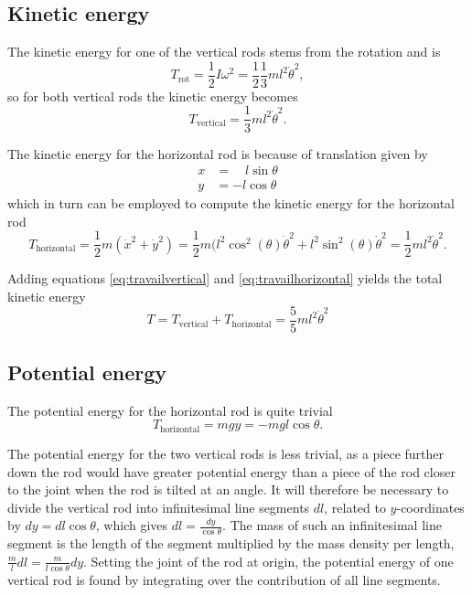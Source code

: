 \documentclass[11pt]{amsart}
\begin{document}
\subsection{Kinetic energy}
The kinetic energy for one of the vertical rods stems from the rotation and is 
\begin{equation*}
T_{\text{rot}} = \frac{1}{2}I \omega ^2 = \frac{1}{2} \frac{1}{3} m l^2 \dot{\theta}^2,
\end{equation*}
so for both vertical rods the kinetic energy becomes
\begin{equation}
T_{\text{vertical}} = \frac{1}{3}ml^2\dot{\theta}^2.
\label{eq:travailvertical}
\end{equation}

The kinetic energy for the horizontal rod is because of translation given by
\begin{align*}
x &= \quad l\sin{\theta} \\
y &= -l\cos{\theta}
\end{align*}
which in turn can be employed to compute the kinetic energy for the horizontal rod
\begin{equation}
T_{\text{horizontal}} = \frac{1}{2}m(\dot{x}^2+\dot{y}^2) = \frac{1}{2}m(l^2\cos^2(\theta) \dot{\theta}^2 + l^2\sin^2(\theta) \dot{\theta}^2 = \frac{1}{2} ml^2 \dot{\theta}^2.
\label{eq:travailhorizontal}
\end{equation}

Adding equations \ref{eq:travailvertical} and \ref{eq:travailhorizontal} yields the total kinetic energy
\begin{equation}
T = T_{\text{vertical}} + T_{\text{horizontal}}= \frac{5}{5}ml^2\dot{\theta}^2
\end{equation}

\subsection{Potential energy}

The potential energy for the horizontal rod is quite trivial
\begin{equation}
T_{\text{horizontal}} = mgy = -mgl\cos\theta.
\label{eq:voltagehorizontal}
\end{equation}

The potential energy for the two vertical rods is less trivial, as a piece further down the rod would have greater potential energy than a piece of the rod closer to the joint when the rod is tilted at an angle. It will therefore be necessary to divide the vertical rod into infinitesimal line segments $dl$, related to $y$-coordinates by $dy = dl\cos\theta$, which gives $dl = \frac{dy}{\cos\theta}$. The mass of such an infinitesimal line segment is the length of the segment multiplied by the mass density per length, $\frac{m}{l}dl = \frac{m}{l\cos\theta}dy$. Setting the joint of the rod at origin, the potential energy of one vertical rod is found by integrating over the contribution of all line segments.
\end{document}
